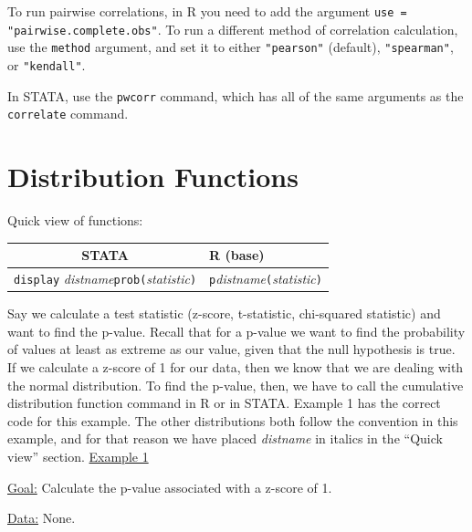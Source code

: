 \documentclass[landscape]{article}
\renewenvironment{Schunk}{\vspace{\topsep}}{\vspace{\topsep}}
\begin{document}
To run pairwise correlations, in R you need to add the argument \texttt{use = "pairwise.complete.obs"}. To run a different method of correlation calculation, use the \texttt{method} argument, and set it to either \texttt{"pearson"} (default), \texttt{"spearman"}, or \texttt{"kendall"}.

In STATA, use the \texttt{pwcorr} command, which has all of the same arguments as the \texttt{correlate} command. 

\section{Distribution Functions}
Quick view of functions:\\
\begin{tabular}{c|l}
STATA & R (base) \\
\hline
\texttt{display} \emph{distname}\texttt{prob(}\emph{statistic}\texttt{)} & \texttt{p}\emph{distname}\texttt{(}\emph{statistic}\texttt{)}
\end{tabular}

Say we calculate a test statistic (z-score, t-statistic, chi-squared statistic) and want to find the p-value. Recall that for a p-value we want to find the probability of values at least as extreme as our value, given that the null hypothesis is true. If we calculate a z-score of 1 for our data, then we know that we are dealing with the normal distribution. To find the p-value, then, we have to call the cumulative distribution function command in R or in STATA. Example 1 has the correct code for this example. The other distributions both follow the convention in this example, and for that reason we have placed \emph{distname} in italics in the ``Quick view'' section.
\newline
\noindent \underline{Example 1}

\underline{Goal:} Calculate the p-value associated with a z-score of 1.

\underline{Data:} None.
\end{document}
